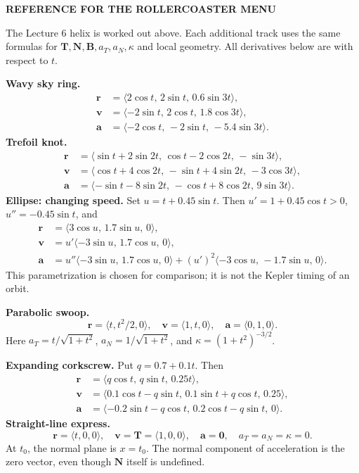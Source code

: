 \documentclass[11pt,letterpaper]{article}
\newcommand{\R}{\mathbf r}\newcommand{\V}{\mathbf v}\newcommand{\A}{\mathbf a}
\newcommand{\T}{\mathbf T}\newcommand{\N}{\mathbf N}\newcommand{\B}{\mathbf B}
\newcommand{\heading}[1]{\vspace{3pt}{\large\bfseries #1}\par}
\newcommand{\subhead}[1]{\textbf{#1}\quad}
\newcommand{\tagline}[1]{{\small\bfseries\color{inkblue}#1}\par}
\begin{document}
\newpage
\tagline{REFERENCE FOR THE ROLLERCOASTER MENU}
\heading{Positions and analytic derivatives}
The Lecture 6 helix is worked out above. Each additional track uses the same formulas for $\T,\N,\B,a_T,a_N,\kappa$ and local geometry. All derivatives below are with respect to $t$.

\subhead{Wavy sky ring.}
\begin{align*}
 \R&=\langle2\cos t,\,2\sin t,\,0.6\sin3t\rangle,\\
 \V&=\langle-2\sin t,\,2\cos t,\,1.8\cos3t\rangle,\\
 \A&=\langle-2\cos t,\,-2\sin t,\,-5.4\sin3t\rangle.
\end{align*}
\subhead{Trefoil knot.}
\begin{align*}
 \R&=\langle\sin t+2\sin2t,\,\cos t-2\cos2t,\,-\sin3t\rangle,\\
 \V&=\langle\cos t+4\cos2t,\,-\sin t+4\sin2t,\,-3\cos3t\rangle,\\
 \A&=\langle-\sin t-8\sin2t,\,-\cos t+8\cos2t,\,9\sin3t\rangle.
\end{align*}
\subhead{Ellipse: changing speed.} Set $u=t+0.45\sin t$. Then $u'=1+0.45\cos t>0$, $u''=-0.45\sin t$, and
\begin{align*}
 \R&=\langle3\cos u,\,1.7\sin u,\,0\rangle,\\
 \V&=u'\langle-3\sin u,\,1.7\cos u,\,0\rangle,\\
 \A&=u''\langle-3\sin u,\,1.7\cos u,\,0\rangle
 +(u')^2\langle-3\cos u,\,-1.7\sin u,\,0\rangle.
\end{align*}
This parametrization is chosen for comparison; it is not the Kepler timing of an orbit.

\subhead{Parabolic swoop.}
\[
 \R=\langle t,t^2/2,0\rangle,\quad \V=\langle1,t,0\rangle,
 \quad\A=\langle0,1,0\rangle.
\]
Here $a_T=t/\sqrt{1+t^2}$, $a_N=1/\sqrt{1+t^2}$, and $\kappa=(1+t^2)^{-3/2}$.

\subhead{Expanding corkscrew.} Put $q=0.7+0.1t$. Then
\begin{align*}
 \R&=\langle q\cos t,\,q\sin t,\,0.25t\rangle,\\
 \V&=\langle0.1\cos t-q\sin t,\,0.1\sin t+q\cos t,\,0.25\rangle,\\
 \A&=\langle-0.2\sin t-q\cos t,\,0.2\cos t-q\sin t,\,0\rangle.
\end{align*}
\subhead{Straight-line express.}
\[
 \R=\langle t,0,0\rangle,\quad \V=\T=\langle1,0,0\rangle,
 \quad\A=\mathbf0,\quad a_T=a_N=\kappa=0.
\]
At $t_0$, the normal plane is $x=t_0$. The normal component of acceleration is the zero vector, even though $\N$ itself is undefined.
\end{document}
